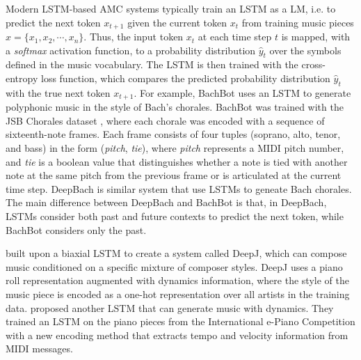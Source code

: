 Modern LSTM-based AMC systems typically train an LSTM as a LM, i.e. to predict the next token $x_{t+1}$ given the current token $x_t$ from training music pieces $x = \{x_1, x_2, \cdots, x_n\}$. Thus, the input token $x_t$ at each time step $t$ is mapped, with a \textit{softmax} activation function, to a probability distribution $\hat{y}_t$ over the symbols defined in the music vocabulary. The LSTM is then trained with the cross-entropy loss function, which compares the predicted probability distribution $\hat{y}_t$ with the true next token $x_{t+1}$. For example, BachBot \cite{liang2017automatic} uses an LSTM to generate polyphonic music in the style of Bach's chorales. BachBot was trained with the JSB Chorales dataset \cite{boulanger2012modeling}, where each chorale was encoded with a sequence of sixteenth-note frames. Each frame consists of four tuples (soprano, alto, tenor, and bass) in the form (\textit{pitch}, \textit{tie}), where \textit{pitch} represents a MIDI pitch number, and \textit{tie} is a boolean value that distinguishes whether a note is tied with another note at the same pitch from the previous frame or is articulated at the current time step. DeepBach \cite{hadjeres2017deepbach} is similar system that use LSTMs to geneate Bach chorales. The main difference between DeepBach and BachBot is that, in DeepBach, LSTMs consider both past and future contexts to predict the next token, while BachBot considers only the past.


\citet{Mao_2018} built upon a biaxial LSTM \cite{johnson2017generating} to create a system called DeepJ, which can compose music conditioned on a specific mixture of composer styles. DeepJ uses a piano roll representation augmented with dynamics information, where the style of the music piece is encoded as a one-hot representation over all artists in the training data. \citet{oore2017learning} proposed another LSTM that can generate music with dynamics. They trained an LSTM on the piano pieces from the International e-Piano Competition \cite{yamahaEPiano} with a new encoding method that extracts tempo and velocity information from MIDI messages.

